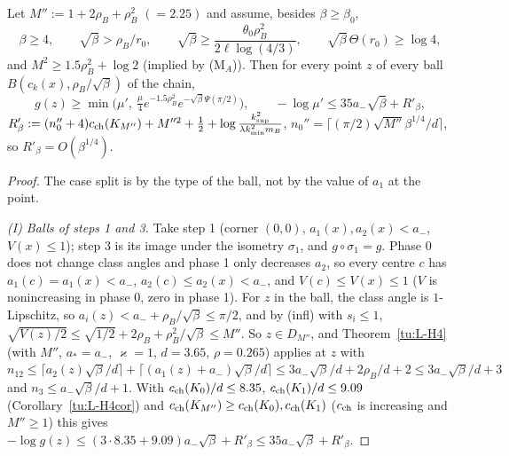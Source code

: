 \begin{lemma}\label{tu:L-balls}
Let $M'':=1+2\rho_B+\rho_B^2$ $(=2.25)$ and assume, besides $\beta\ge\beta_0$,
\[
\beta\ge4,\qquad \sqrt\beta>\rho_B/r_0,\qquad \sqrt\beta\ge\frac{\theta_0\rho_B^2}{2\ell\log(4/3)},\qquad\sqrt\beta\,\Theta(r_0)\ge\log4 ,
\]
and $M^2\ge1.5\rho_B^2+\log2$ (implied by (M$_A$)). Then for every point $z$ of every ball $B(c_k(x),\rho_B/\sqrt\beta)$ of the chain,
\[
g(z)\ge\min\big(\mu',\ \tfrac\mu4e^{-1.5\rho_B^2}e^{-\sqrt\beta\Psi(\pi/2)}\big),\qquad
-\log\mu'\le35a_-\sqrt\beta+R'_\beta,
\]
$R'_\beta:=(n_0''+4)c_{\rm ch}(K_{M''})+M''^2+\tfrac12+\log\frac{k_{\sup}^2}{\lambda k_{\min}^2m_B}$, $n_0''=\lceil(\pi/2)\sqrt{M''}\beta^{1/4}/d\rceil$,
so $R'_\beta=O(\beta^{1/4})$.
\end{lemma}

\begin{proof}
The case split is by the type of the ball, not by the value of $a_1$ at the point.

\emph{(I) Balls of steps 1 and 3.} Take step 1 (corner $(0,0)$, $a_1(x),a_2(x)<a_-$, $V(x)\le1$); step 3 is its image under the
isometry $\sigma_1$, and $g\circ\sigma_1=g$. Phase 0 does not change class angles and phase 1 only decreases $a_2$, so every centre $c$
has $a_1(c)=a_1(x)<a_-$, $a_2(c)\le a_2(x)<a_-$, and $V(c)\le V(x)\le1$ ($V$ is nonincreasing in phase 0, zero in phase 1).
For $z$ in the ball, the class angle is $1$-Lipschitz, so $a_i(z)<a_-+\rho_B/\sqrt\beta\le\pi/2$, and by (infl) with $s_i\le1$,
$\sqrt{V(z)/2}\le\sqrt{1/2}+2\rho_B+\rho_B^2/\sqrt\beta\le M''$. So $z\in D_{M''}$, and Theorem~\ref{tu:L-H4} (with $M''$, $a_*=a_-$,
$\varkappa=1$, $d=3.65$, $\rho=0.265$) applies at $z$ with
$n_{12}\le\lceil a_2(z)\sqrt\beta/d\rceil+\lceil(a_1(z)+a_-)\sqrt\beta/d\rceil\le3a_-\sqrt\beta/d+2\rho_B/d+2\le3a_-\sqrt\beta/d+3$ and
$n_3\le a_-\sqrt\beta/d+1$. With $c_{\rm ch}(K_0)/d\le8.35$, $c_{\rm ch}(K_1)/d\le9.09$ (Corollary~\ref{tu:L-H4cor}) and
$c_{\rm ch}(K_{M''})\ge c_{\rm ch}(K_0),c_{\rm ch}(K_1)$ ($c_{\rm ch}$ is increasing and $M''\ge1$) this gives
$-\log g(z)\le(3\cdot8.35+9.09)a_-\sqrt\beta+R'_\beta\le35a_-\sqrt\beta+R'_\beta$.


\end{proof}
